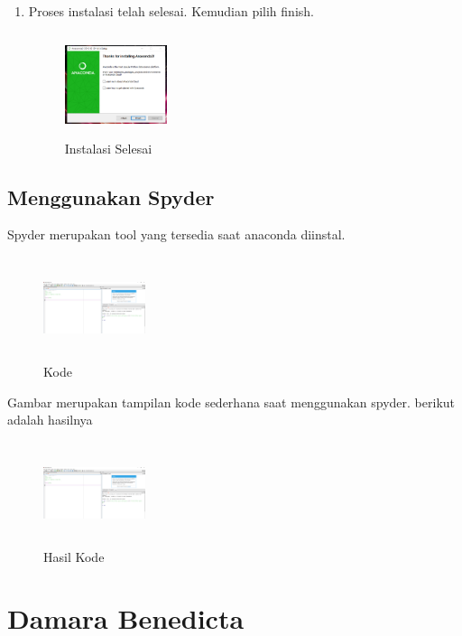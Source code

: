 \begin{enumerate}
\item Proses instalasi telah selesai. Kemudian pilih finish.
\begin{figure}[!htbp]
    \centering
    \includegraphics[width=3cm,height=3cm]{figures/9.png}
    \caption{Instalasi Selesai}
    \label{finish}
    \end{figure}
\end{enumerate}

\subsection{Menggunakan Spyder}
Spyder merupakan tool yang tersedia saat anaconda diinstal.
\begin{figure}[!htbp]
    \centering
    \includegraphics[width=3cm,height=3cm]{figures/10.png}
    \caption{Kode}
    \label{code}
    \end{figure}

Gambar merupakan tampilan kode sederhana saat menggunakan spyder. berikut adalah hasilnya
\begin{figure}[!htbp]
    \centering
    \includegraphics[width=3cm,height=3cm]{figures/11.png}
    \caption{Hasil Kode}
    \label{hasil}
    \end{figure}
\section{Damara Benedicta}
